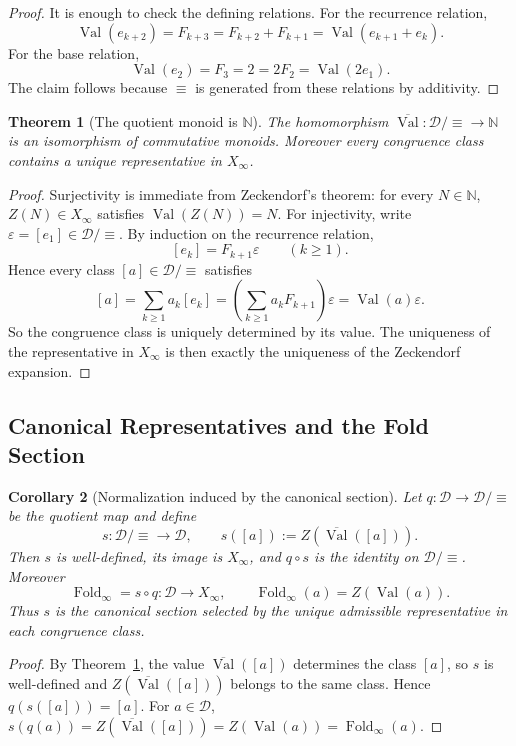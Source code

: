 \documentclass[11pt,letterpaper]{article}
\numberwithin{equation}{section}
\theoremstyle{plain}
\newtheorem{theorem}{Theorem}[section]
\newtheorem{corollary}[theorem]{Corollary}
\theoremstyle{definition}
\theoremstyle{remark}
\newcommand{\D}{\mathcal{D}}
\newcommand{\NN}{\mathbb{N}}
\newcommand{\Xinf}{X_\infty}
\newcommand{\leanverified}[1]{}
\DeclareMathOperator{\Val}{Val}
\DeclareMathOperator{\Fold}{Fold}
\begin{document}
\begin{proof}
It is enough to check the defining relations.  For the recurrence relation,
\[
\Val(e_{k+2})=F_{k+3}=F_{k+2}+F_{k+1}=\Val(e_{k+1}+e_k).
\]
For the base relation,
\[
\Val(e_2)=F_3=2=2F_2=\Val(2e_1).
\]
The claim follows because $\equiv$ is generated from these relations by
additivity.
\end{proof}

\begin{theorem}[The quotient monoid is $\NN$]\label{thm:monoid-quotient-is-N}
The homomorphism $\overline{\Val}:\D/\!\equiv \to \NN$ is an isomorphism of
commutative monoids.  Moreover every congruence class contains a unique
representative in $\Xinf$.
\leanverified{paper_zeckendorf_monoid_quotient_is_N_seeds}
\end{theorem}

\begin{proof}
Surjectivity is immediate from Zeckendorf's theorem: for every $N\in\NN$,
$Z(N)\in \Xinf$ satisfies $\Val(Z(N))=N$.  For injectivity, write
$\varepsilon=[e_1]\in\D/\!\equiv$.  By induction on the recurrence relation,
\[
[e_k]=F_{k+1}\varepsilon \qquad (k\ge 1).
\]
Hence every class $[a]\in\D/\!\equiv$ satisfies
\[
[a]
=
\sum_{k\ge 1} a_k[e_k]
=
\left(\sum_{k\ge 1} a_kF_{k+1}\right)\varepsilon
=
\Val(a)\varepsilon.
\]
So the congruence class is uniquely determined by its value.  The uniqueness
of the representative in $\Xinf$ is then exactly the uniqueness of the
Zeckendorf expansion.
\end{proof}

\subsection{Canonical Representatives and the Fold Section}

\begin{corollary}[Normalization induced by the canonical section]\label{cor:fold-as-section}
Let $q:\D\to\D/\!\equiv$ be the quotient map and define
\[
 s:\D/\!\equiv\to\D,
 \qquad
 s([a]):=Z(\overline{\Val}([a])).
\]
Then $s$ is well-defined, its image is $\Xinf$, and $q\circ s$ is the identity
on $\D/\!\equiv$.  Moreover
\[
\Fold_\infty=s\circ q:\D\to\Xinf,
\qquad
\Fold_\infty(a)=Z(\Val(a)).
\]
Thus $s$ is the canonical section selected by the unique admissible
representative in each congruence class.
\leanverified{paper_zeckendorf_fold_as_section_seeds}
\end{corollary}

\begin{proof}
By Theorem~\ref{thm:monoid-quotient-is-N}, the value
$\overline{\Val}([a])$ determines the class $[a]$, so $s$ is well-defined and
$Z(\overline{\Val}([a]))$ belongs to the same class.  Hence
$q(s([a]))=[a]$.  For $a\in\D$,
$s(q(a))=Z(\overline{\Val}([a]))=Z(\Val(a))=\Fold_\infty(a)$.
\end{proof}
\end{document}
